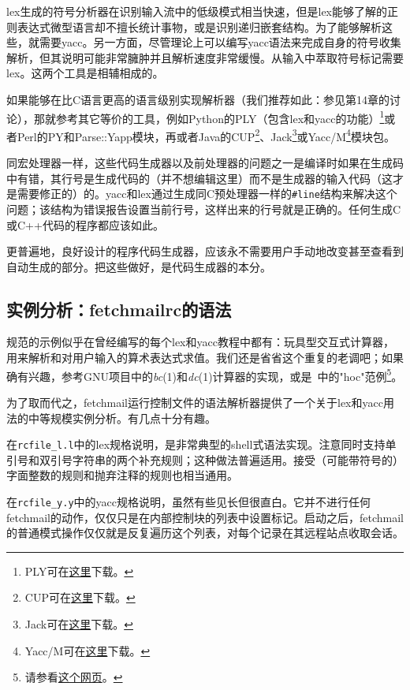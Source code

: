 \documentclass[12pt,oneside]{ctexbook}
\begin{document}
\begin{common-format}
lex生成的符号分析器在识别输入流中的低级模式相当快速，但是lex能够了解的正则表达式微型语言却不擅长统计事物，或是识别递归嵌套结构。为了能够解析这些，就需要yacc。另一方面，尽管理论上可以编写yacc语法来完成自身的符号收集解析，但其说明可能非常臃肿并且解析速度非常缓慢。从输入中萃取符号标记需要lex。这两个工具是相辅相成的。

如果能够在比C语言更高的语言级别实现解析器（我们推荐如此：参见第14章的讨论），那就参考其它等价的工具，例如Python的PLY（包含lex和yacc的功能）\footnote{PLY可在\href{http://systems.cs.uchicago.edu/ply/}{这里}下载。}或者Perl的PY和Parse::Yapp模块，再或者Java的CUP\footnote{CUP可在\href{http://www.cs.princeton.edu/~appel/modern/java/CUP/}{这里}下载。}、Jack\footnote{Jack可在\href{http://www.javaworld.com/javaworld/jw-12-1996/jw-12-jack.html}{这里}下载。}或Yacc/M\footnote{Yacc/M可在\href{http://david.tribble.com/yaccm.html}{这里}下载。}模块包。

同宏处理器一样，这些代码生成器以及前处理器的问题之一是编译时如果在生成码中有错，其行号是生成代码的（并不想编辑这里）而不是生成器的输入代码（这才是需要修正的）的。yacc和lex通过生成同C预处理器一样的\verb+#line+结构来解决这个问题；该结构为错误报告设置当前行号，这样出来的行号就是正确的。任何生成C或C++代码的程序都应该如此。

更普遍地，良好设计的程序代码生成器，应该永不需要用户手动地改变甚至查看到自动生成的部分。把这些做好，是代码生成器的本分。

\subsection{实例分析：fetchmailrc的语法}
规范的示例似乎在曾经编写的每个lex和yacc教程中都有：玩具型交互式计算器，用来解析和对用户输入的算术表达式求值。我们还是省省这个重复的老调吧；如果确有兴趣，参考GNU项目中的\textit{bc}(1)和\textit{dc}(1)计算器的实现，或是~\cite{Kernighan-Pike84}中的"hoc"范例\footnote{请参看\href{http://cm.bell-labs.com/cm/cs/upe/}{这个网页}。}。

为了取而代之，fetchmail运行控制文件的语法解析器提供了一个关于lex和yacc用法的中等规模实例分析。有几点十分有趣。

在\verb+rcfile_l.l+中的lex规格说明，是非常典型的shell式语法实现。注意同时支持单引号和双引号字符串的两个补充规则；这种做法普遍适用。接受（可能带符号的）字面整数的规则和抛弃注释的规则也相当通用。

在\verb+rcfile_y.y+中的yacc规格说明，虽然有些见长但很直白。它并不进行任何fetchmail的动作，仅仅只是在内部控制块的列表中设置标记。启动之后，fetchmail的普通模式操作仅仅就是反复遍历这个列表，对每个记录在其远程站点收取会话。


\end{common-format}
\end{document}
